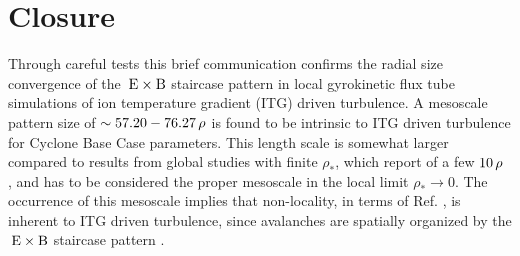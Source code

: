 
\chapter{Closure}
\label{chap:close}

Through careful tests this brief communication confirms the radial size convergence of the $\mathrm{\:E}\times\mathrm{B}$ staircase pattern in local gyrokinetic flux tube simulations of ion temperature gradient (ITG) driven turbulence.
A mesoscale pattern size of $\sim 57.20 - 76.27\,\rho$ is found to be intrinsic to ITG driven turbulence for Cyclone Base Case parameters.
This length scale is somewhat larger compared to results from global studies with finite $\rho_\ast$, which report of a few $10\,\rho$ \cite{pradalier2010}, and has to be considered the proper mesoscale in the local limit $\rho_\ast \rightarrow 0$.  
The occurrence of this mesoscale implies that non-locality, in terms of Ref. \cite{pradalier2010}, is inherent to ITG driven turbulence, since avalanches are spatially organized by the $\mathrm{\:E}\times\mathrm{B}$ staircase pattern \cite{mcmillan2009, pradalier2010, rath2016, peeters2016}. 